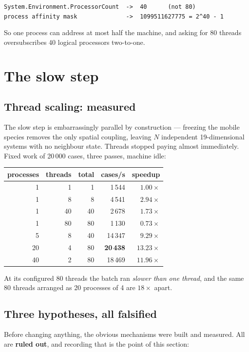 \documentclass[11pt]{article}
\begin{document}
\begin{lstlisting}
System.Environment.ProcessorCount  ->  40      (not 80)
process affinity mask              ->  1099511627775 = 2^40 - 1
\end{lstlisting}

So one process can address at most half the machine, and asking for 80 threads
oversubscribes 40 logical processors two-to-one.

\section{The slow step}

\subsection{Thread scaling: measured}
The slow step is embarrassingly parallel by construction --- freezing the mobile
species removes the only spatial coupling, leaving $N$ independent
19-dimensional systems with no neighbour state. Threads stopped paying almost
immediately. Fixed work of 20\,000 cases, three passes, machine idle:

\begin{center}
\begin{tabular}{rrrrr}
\toprule
processes & threads & total & cases/s & speedup\\
\midrule
1 & 1 & 1 & 1\,544 & $1.00\times$\\
1 & 8 & 8 & 4\,541 & $2.94\times$\\
1 & 40 & 40 & 2\,678 & $1.73\times$\\
1 & 80 & 80 & 1\,130 & $\mathbf{0.73\times}$\\
\midrule
5 & 8 & 40 & 14\,347 & $9.29\times$\\
\rowcolor{green!12}
20 & 4 & 80 & \textbf{20\,438} & $\mathbf{13.23\times}$\\
40 & 2 & 80 & 18\,469 & $11.96\times$\\
\bottomrule
\end{tabular}
\end{center}

At its configured 80 threads the batch ran \emph{slower than one thread}, and
the same 80 threads arranged as 20 processes of 4 are $18\times$ apart.

\subsection{Three hypotheses, all falsified}
Before changing anything, the obvious mechanisms were built and measured. All
are \textbf{ruled out}, and recording that is the point of this section:
\end{document}
